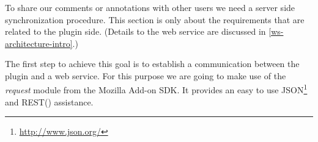 \subsubsection[Communication]{\reqPiii}
To share our comments or annotations with other users we need a server side synchronization procedure. This section is only about the requirements that are related to the plugin side. (Details to the web service are discussed in  \ref{ws-architecture-intro}.)

The first step to achieve this goal is to establish a communication between the plugin and a web service. For this purpose we are going to make use of the \emph{request} module from the Mozilla Add-on SDK. It provides an easy to use JSON\footnote{\url{http://www.json.org/}} and REST(\cite{fielding2000principled}) assistance. 

